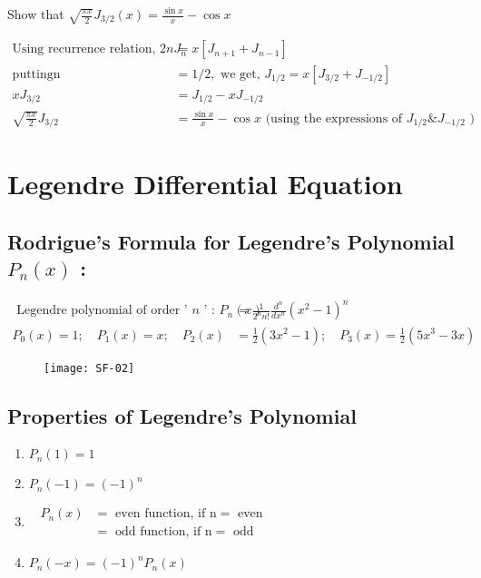 \begin{exercise}
	Show that $\sqrt{\frac{\pi x}{2}} J_{3 / 2}(x)=\frac{\sin x}{x}-\cos x$
\end{exercise}
\begin{answer}
	\begin{align*}
	\text{Using recurrence relation, }2 n J_{n}&=x\left[J_{n+1}+J_{n-1}\right]\\
	\text{putting}\mathrm{n}&=1 / 2,\text{ we get, }J_{1 / 2}=x\left[J_{3 / 2}+J_{-1 / 2}\right]\\
	x J_{3 / 2}&=J_{1 / 2}-x J_{-1 / 2} \\ \sqrt{\frac{\pi x}{2}} J_{3 / 2}&=\frac{\sin x}{x}-\cos x \text { (using the expressions of } J_{1 / 2} \& J_{-1 / 2} \text { ) }
	\end{align*}
\end{answer}
\section{Legendre Differential Equation}
\subsection{Rodrigue's Formula for Legendre's Polynomial $P_{n}(x)$ :}
\begin{align*}
\text { Legendre polynomial of order ' } n \text { ' : } P_{n}(x)&=\frac{1}{2^{n} n !} \frac{d^{n}}{d x^{n}}\left(x^{2}-1\right)^{n}\\
P_{0}(x)=1 ; \quad P_{1}(x)=x ; \quad P_{2}(x)&=\frac{1}{2}\left(3 x^{2}-1\right) ; \quad P_{3}(x)=\frac{1}{2}\left(5 x^{3}-3 x\right)
\end{align*}
\begin{figure}[H]
	\centering
	\texttt{[image: SF-02]}
\end{figure}
\subsection{Properties of Legendre's Polynomial}
\begin{enumerate}
	\item $P_{n}(1)=1$
	\item $P_{n}(-1)=(-1)^{n}$
	\item $\left. \right.$\ $\begin{aligned}
	P_{n}(x)&=\text { even function, if } \mathrm{n}=\text { even }\\
	        &=\text { odd function, if } \mathrm{n}=\text { odd }
	\end{aligned}$
	\item $P_{n}(-x)=(-1)^{n} P_{n}(x)$
\end{enumerate}

